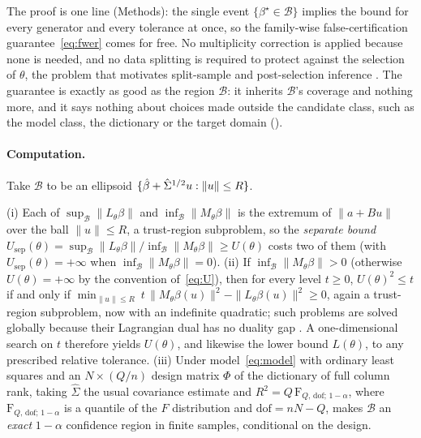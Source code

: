The proof is one line (Methods): the single event $\{\beta^\star \in
\mathcal B\}$ implies the bound for every generator and every tolerance at
once, so the family-wise false-certification guarantee~\eqref{eq:fwer} comes
for free. No multiplicity correction is applied because none is needed, and no
data splitting is required to protect against the selection of $\theta$, the
problem that motivates split-sample and post-selection inference
\citep{berk2013valid,lee2016exact,meinshausen2009pvalues,andrews2024inference}.
The guarantee is exactly as good as the region $\mathcal B$: it inherits
$\mathcal B$'s coverage and nothing more, and it says nothing about choices made
outside the candidate class, such as the model class, the dictionary or the
target domain ().

\paragraph{Computation.} Take $\mathcal B$ to be an ellipsoid $\{\hat{\beta} +
\hat\Sigma^{1/2} u : \|u\| \le R\}$.

\begin{proposition}[Evaluation]
\label{prop:closedform}
(i) Each of $\sup_{\mathcal B}\|L_\theta\beta\|$ and $\inf_{\mathcal
B}\|M_\theta\beta\|$ is the extremum of $\|a + Bu\|$ over the ball $\|u\| \le
R$, a trust-region subproblem, so the \emph{separate bound}
$U_{\mathrm{sep}}(\theta) = \sup_{\mathcal B}\|L_\theta\beta\| / \inf_{\mathcal
B}\|M_\theta\beta\| \ge U(\theta)$ costs two of them (with
$U_{\mathrm{sep}}(\theta) = +\infty$ when $\inf_{\mathcal B}\|M_\theta\beta\| = 0$).
(ii) If $\inf_{\mathcal B}\|M_\theta\beta\| > 0$ (otherwise $U(\theta) = +\infty$
by the convention of~\eqref{eq:U}), then for every level $t \ge 0$,
$U(\theta)^2 \le t$ if and only if
$\min_{\|u\|\le R}\ t\,\|M_\theta \beta(u)\|^2 - \|L_\theta\beta(u)\|^2 \ge 0$,
again a trust-region subproblem, now with an indefinite quadratic; such
problems are solved globally because their Lagrangian dual has no duality gap
\citep{more1983computing,conn2000trust}. A one-dimensional search on $t$
therefore yields $U(\theta)$, and likewise the lower bound $L(\theta)$, to any
prescribed relative tolerance.
(iii) Under model~\eqref{eq:model} with ordinary least squares and an
$N \times (Q/n)$ design matrix $\Phi$ of the dictionary of full column rank,
taking $\hat\Sigma$ the usual covariance estimate and
$R^2 = Q\,\mathrm{F}_{Q,\,\mathrm{dof};\,1-\alpha}$, where
$\mathrm{F}_{Q,\,\mathrm{dof};\,1-\alpha}$ is a quantile of the $F$
distribution and $\mathrm{dof} = nN - Q$, makes $\mathcal B$ an \emph{exact}
$1-\alpha$ confidence region in finite samples, conditional on the design.
\end{proposition}

